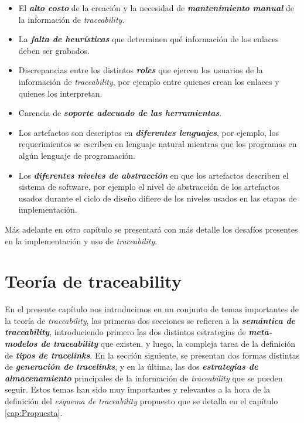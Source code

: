 \documentclass[a4paper,12pt,oneside,spanish]{book}
\begin{document}
\begin{itemize}

\item El \textit{\textbf{alto costo}} de la creación y la necesidad de \textit{\textbf{mantenimiento manual}} de la información de \textit{traceability}.

\item La \textit{\textbf{falta de heurísticas}} que determinen qué información de los enlaces deben ser grabados.

\item Discrepancias entre los distintos \textit{\textbf{roles}} que ejercen los usuarios de la información de \textit{traceability}, por ejemplo entre quienes crean los enlaces y quienes los interpretan.

\item Carencia de \textit{\textbf{soporte adecuado de las herramientas}}.

\item Los artefactos son descriptos en \textit{\textbf{diferentes lenguajes}}, por ejemplo, los requerimientos se escriben en lenguaje natural mientras que los programas en algún lenguaje de programación.

\item Los \textit{\textbf{diferentes niveles de abstracción}} en que los artefactos describen el sistema de software, por ejemplo el nivel de abstracción de los artefactos usados durante el ciclo de diseño difiere de los niveles usados en las etapas de implementación.

\end{itemize}

Más adelante en otro capítulo se presentará con más detalle los desafíos presentes en la implementación y uso de \textit{traceability}.




\chapter{Teoría de traceability}

En el presente capítulo nos introducimos en un conjunto de temas importantes de la teoría de \textit{traceability}, las primeras dos secciones se refieren a la \textit{\textbf{semántica de traceability}}, introduciendo primero las dos distintos estrategias de \textit{\textbf{meta-modelos de traceability}} que existen, y luego, la compleja tarea de la definición de \textit{\textbf{tipos de tracelinks}}. En la sección siguiente, se presentan dos formas distintas de \textit{\textbf{generación de tracelinks}}, y en la última, las dos \textit{\textbf{estrategias de almacenamiento}} principales de la información de \textit{traceability} que se pueden seguir. Estos temas han sido muy importantes y relevantes a la hora de la definición del \textit{esquema de traceability} propuesto que se detalla en el capítulo \ref{cap:Propuesta}.
\end{document}

